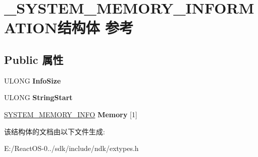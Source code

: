 \hypertarget{struct___s_y_s_t_e_m___m_e_m_o_r_y___i_n_f_o_r_m_a_t_i_o_n}{}\section{\+\_\+\+S\+Y\+S\+T\+E\+M\+\_\+\+M\+E\+M\+O\+R\+Y\+\_\+\+I\+N\+F\+O\+R\+M\+A\+T\+I\+O\+N结构体 参考}
\label{struct___s_y_s_t_e_m___m_e_m_o_r_y___i_n_f_o_r_m_a_t_i_o_n}
\subsection*{Public 属性}
\begin{DoxyCompactItemize}
\item 
\mbox{\label{struct___s_y_s_t_e_m___m_e_m_o_r_y___i_n_f_o_r_m_a_t_i_o_n_a2060088d9b5529c52a60a131c66be4d7}} 
U\+L\+O\+NG {\bfseries Info\+Size}
\item 
\mbox{\label{struct___s_y_s_t_e_m___m_e_m_o_r_y___i_n_f_o_r_m_a_t_i_o_n_aed19ec5f61a11a3f53acb2f8371c9f7d}} 
U\+L\+O\+NG {\bfseries String\+Start}
\item 
\mbox{\label{struct___s_y_s_t_e_m___m_e_m_o_r_y___i_n_f_o_r_m_a_t_i_o_n_a201c22fa5f7b8d5e56cad9f257ff4566}} 
\hyperlink{struct___s_y_s_t_e_m___m_e_m_o_r_y___i_n_f_o}{S\+Y\+S\+T\+E\+M\+\_\+\+M\+E\+M\+O\+R\+Y\+\_\+\+I\+N\+FO} {\bfseries Memory} \mbox{[}1\mbox{]}
\end{DoxyCompactItemize}


该结构体的文档由以下文件生成\+:\begin{DoxyCompactItemize}
\item 
E\+:/\+React\+O\+S-\/0../sdk/include/ndk/extypes.\+h\end{DoxyCompactItemize}
